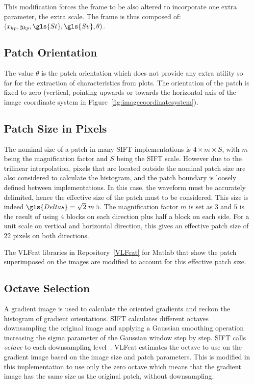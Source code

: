 This modification forces the frame to be also altered to incorporate one extra parameter, the extra scale.  The frame is thus composed of: $ ( x_{kp}, y_{kp}, \gls{St}, \gls{Sv}, \theta ) $.  

\subsection{Patch Orientation}

The value $\theta$ is the patch orientation which does not provide any extra utility so far for the extraction of characteristics from plots.  The orientation of the patch is fixed to zero (vertical, pointing upwards or towards the horizontal axis of the image coordinate system in Figure~\ref{fig:imagecoordinatesystem}).

\subsection{Patch Size in Pixels}

The nominal size of a patch in many SIFT implementations is $4 \times m \times S$, with $m$ being the magnification factor and $S$ being the SIFT scale.  However due to the trilinear interpolation, pixels that are located outside the nominal patch size are also considered to calculate the histogram, and the patch boundary is loosely defined between implementations.  In this case, the waveform must be accurately delimited, hence the effective size of the patch must to be considered. This size is indeed $\gls{Deltas} = \sqrt{2} \; m \; 5$.  The magnification factor $m$ is set as $3$ and $5$ is the result of using $4$ blocks on each direction plus half a block on each side.  For a unit scale on vertical and horizontal direction, this gives an effective patch size of $22$ pixels on both directions.

The VLFeat libraries in Repository~\ref{VLFeat} for Matlab that show the patch superimposed on the images are modified to account for this effective patch size.

\subsection{Octave Selection}

A gradient image is used to calculate the oriented gradients and reckon the histogram of gradient orientations.   SIFT calculates different octaves downsampling the original image and applying a Gaussian smoothing operation increasing the sigma parameter of the Gaussian window step by step.  SIFT calls \textit{octave} to each downsampling level~\cite{Lowe2004,Rey-Otero2014}. VLFeat estimates the octave to use on the gradient image based on the image size and patch parameters.   This is modified in this implementation to use only the zero octave which means that the gradient image has the same size as the original patch, without downsampling.

